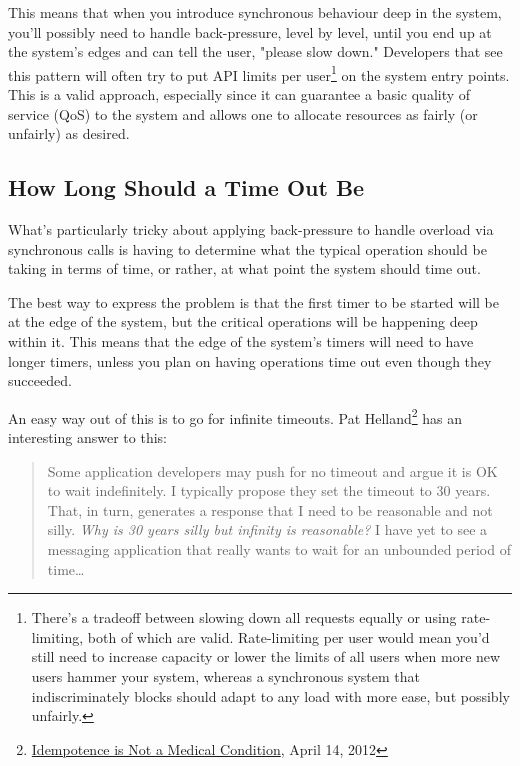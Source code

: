 \documentclass[11pt, oneside]{book}   	%
\begin{document}
This means that when you introduce synchronous behaviour deep in the system, you'll possibly need to handle back-pressure, level by level, until you end up at the system's edges and can tell the user, "please slow down."
Developers that see this pattern will often try to put API limits per user\footnote{There's a tradeoff between slowing down all requests equally or using rate-limiting, both of which are valid. Rate-limiting per user would mean you'd still need to increase capacity or lower the limits of all users when more new users hammer your system, whereas a synchronous system that indiscriminately blocks should adapt to any load with more ease, but possibly unfairly.} on the system entry points. This is a valid approach, especially since it can guarantee a basic quality of service (QoS) to the system and allows one to allocate resources as fairly (or unfairly) as desired.
  
\subsection{How Long Should a Time Out Be}

What's particularly tricky about applying back-pressure to handle overload via synchronous calls is having to determine what the typical operation should be taking in terms of time, or rather, at what point the system should time out.

The best way to express the problem is that the first timer to be started will be at the edge of the system, but the critical operations will be happening deep within it. This means that the edge of the system's timers will need to have longer timers, unless you plan on having operations time out even though they succeeded.

An easy way out of this is to go for infinite timeouts. Pat Helland\footnote{\href{http://queue.acm.org/detail.cfm?id=2187821}{Idempotence is Not a Medical Condition}, April 14, 2012} has an interesting answer to this:

\begin{quote}
Some application developers may push for no timeout and argue it is OK to wait indefinitely. I typically propose they set the timeout to 30 years. That, in turn, generates a response that I need to be reasonable and not silly. \emph{Why is 30 years silly but infinity is reasonable?} I have yet to see a messaging application that really wants to wait for an unbounded period of time…
\end{quote}
\end{document}
